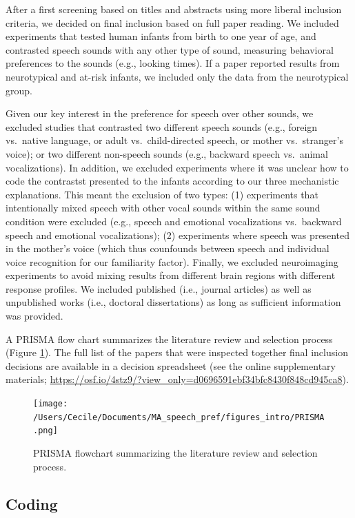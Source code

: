 \documentclass[man]{apa6}
\begin{document}
After a first screening based on titles and abstracts using more liberal inclusion criteria, we decided on final inclusion based on full paper reading. We included experiments that tested human infants from birth to one year of age, and contrasted speech sounds with any other type of sound, measuring behavioral preferences to the sounds (e.g., looking times). If a paper reported results from neurotypical and at-risk infants, we included only the data from the neurotypical group.

Given our key interest in the preference for speech over other sounds, we excluded studies that contrasted two different speech sounds (e.g., foreign vs.~native language, or adult vs.~child-directed speech, or mother vs.~stranger's voice); or two different non-speech sounds (e.g., backward speech vs.~animal vocalizations). In addition, we excluded experiments where it was unclear how to code the contrastst presented to the infants according to our three mechanistic explanations. This meant the exclusion of two types: (1) experiments that intentionally mixed speech with other vocal sounds within the same sound condition were excluded (e.g., speech and emotional vocalizations vs.~backward speech and emotional vocalizations); (2) experiments where speech was presented in the mother's voice (which thus counfounds between speech and individual voice recognition for our familiarity factor). Finally, we excluded neuroimaging experiments to avoid mixing results from different brain regions with different response profiles. We included published (i.e., journal articles) as well as unpublished works (i.e., doctoral dissertations) as long as sufficient information was provided.

A PRISMA flow chart summarizes the literature review and selection process (Figure \ref{fig:prisma}). The full list of the papers that were inspected together final inclusion decisions are available in a decision spreadsheet (see the online supplementary materials; \url{https://osf.io/4stz9/?view_only=d0696591ebf34bfc8430f848cd945ca8}).

\begin{figure}
\centering
\texttt{[image: /Users/Cecile/Documents/MA\_speech\_pref/figures\_intro/PRISMA.png]}
\caption{\label{fig:prisma}PRISMA flowchart summarizing the literature review and selection process.}
\end{figure}

\hypertarget{coding}{%
\subsection{Coding}\label{coding}}
\end{document}
